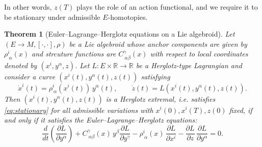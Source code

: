 \documentclass[11pt,a4paper]{article}
\newtheorem{theorem}{Theorem}[section]
\theoremstyle{definition}
\begin{document}
In other words, $z(T)$ plays the role of an action functional, and we require
it to be stationary under admissible $E$-homotopies.


\begin{theorem}[Euler--Lagrange--Herglotz equations on a Lie algebroid]
\label{thm:ELH_algebroid}
Let $(E\to M,[\cdot,\cdot],\rho)$ be a Lie algebroid whose anchor components are given by
$\rho^i_{\ \alpha}(x)$ and strcuture functions are $C^\gamma_{\ \alpha\beta}(x)$ with respect to local coordinates denoted by $(x^{i},y^{\alpha},z)$.
Let $L\colon E\times\mathbb{R}\to\mathbb{R}$ be a Herglotz-type Lagrangian and consider a curve $(x^{i}(t),y^{\alpha}(t),z(t))$ satisfying
\begin{equation}\label{eq:ELH_constraints}
\dot x^i(t) = \rho^i_{\ \alpha}(x^{i}(t))\,y^\alpha(t), 
\qquad
\dot z(t) = L(x^{i}(t),y^{\alpha}(t),z(t)).
\end{equation}
Then $(x^{i}(t),y^{\alpha}(t),z(t))$ is a Herglotz extremal, i.e. satisfies
\eqref{eq:stationary} for all admissible variations with $x^{i}(0),x^{i}(T),z(0)$ fixed, 
if and only if it satisfies the Euler--Lagrange--Herglotz equations:
\begin{equation}\label{eq:ELH_equations}
\frac{d}{dt}\left(\frac{\partial L}{\partial y^\alpha}\right)
+ C^\gamma_{\ \alpha\beta}(x)\,y^\beta \frac{\partial L}{\partial y^\gamma}
- \rho^i_{\ \alpha}(x)\,\frac{\partial L}{\partial x^i}
- \frac{\partial L}{\partial z}\,\frac{\partial L}{\partial y^\alpha}
= 0.
\end{equation}
\end{theorem}
\end{document}
